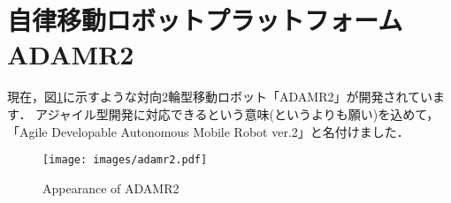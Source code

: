\documentclass[{../../master}]{subfiles}
\begin{document}
\section{自律移動ロボットプラットフォーム \textsf{ADAMR2}}

現在，図\ref{fig:adamr2}に示すような対向2輪型移動ロボット「ADAMR2」が開発されています．
アジャイル型開発に対応できるという意味(というよりも願い)を込めて，
「\textsf{A}gile \textsf{D}evelopable \textsf{A}utonomous \textsf{M}obile \textsf{R}obot ver.\textsf{2}」と名付けました．

\begin{figure}[h]
  \centering
  \texttt{[image: images/adamr2.pdf]}
  \label{fig:adamr2}
  \caption{Appearance of ADAMR2}
\end{figure}
\end{document}
